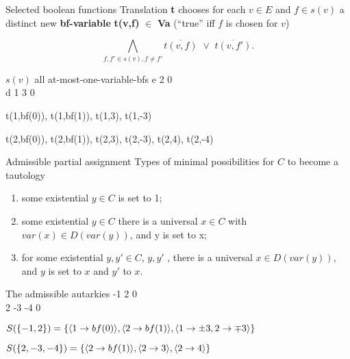 \documentclass[xcolor=table	]{beamer}
\DeclarePairedDelimiter\ev{\langle}{\rangle}%
\begin{document}
\begin{frame}{Selected boolean functions}
Translation \textbf{t} chooses for each $v \in E$ and $f \in s(v)$ a distinct new \textbf{bf-variable} \newline 
  \textbf{t(v,f)} $\in$  \textbf{Va}   (``true'' iff $f$ is chosen for $v$)
  
\begin{equation}
  \bigwedge_{f, f' \in s(v), f \ne f'} \overline{t(v,f)} \,\, \lor \,\, \overline{t(v,f')}.
 \end{equation}
 
\begin{exampleblock}{$s(v)$ all at-most-one-variable-bfs}
e 2 0 \\
d 1 3 0 \newline 

    t(1,bf(0)), t(1,bf(1)), t(1,3), t(1,-3) \newline 

    t(2,bf(0)), t(2,bf(1)), t(2,3), t(2,-3), t(2,4), t(2,-4)
 
 \end{exampleblock}
\end{frame}

\begin{frame}{Admissible partial assignment}
    Types of minimal possibilities for $C$ to become a tautology
    \begin{enumerate}
        \item some existential $y \in C$ is set to 1;
        \item some existential $y \in C$ there is a universal $x \in C$ with $var(x) \in  D(var(y))$, and y is set to x;
        \item for some existential $y, y' \in C$, $y, y'$ , there is a universal $x \in D(var(y))$, and $y$ is set to $x$ and $y'$ to $x$. 
    \end{enumerate}

\begin{exampleblock}{The admissible autarkies}
-1 2 0 \\
2 -3 -4 0 \newline 

$S(\{-1,2 \}) = \{ \ev{1 \to bf(0)}, \ev{2 \to bf(1)}, \ev{1 \to \pm 3, 2 \to  \mp 3} \} $ \newline 

$S(\{2,-3,-4\}) = \{ \ev{2 \to bf(1)}, \ev{2 \to 3}, \ev{2 \to 4} \}$
\end{exampleblock}

\end{frame}
\end{document}
